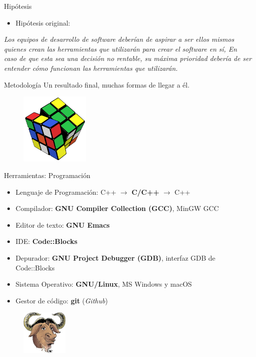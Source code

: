 \documentclass{beamer}
\begin{document}
\begin{frame}{Hipótesis}
  \begin{itemize}
    \item{Hipótesis original:}
  \end{itemize}
  \textit{Los equipos de desarrollo de software deberían de aspirar a ser ellos mismos quienes crean las herramientas que utilizarán para crear el software en sí, En caso de que esta sea una decisión no rentable, su máxima prioridad debería de ser entender cómo funcionan las herramientas que utilizarán.}
\end{frame}

\begin{frame}{Metodología}
  Un resultado final, muchas formas de llegar a él.
  \vfill
  \begin{figure} [h]
    \centering
    \includegraphics[width=0.3\textwidth]{img/rubik}
  \end{figure}
\end{frame}

\begin{frame}{Herramientas: Programación}
  \begin{itemize}
  \item{Lenguaje de Programación: C++ $\rightarrow$ \textbf{C/C++} $\rightarrow$ C++}
  \item{Compilador: \textbf{GNU Compiler Collection (GCC)}, MinGW GCC}
  \item{Editor de texto: \textbf{GNU Emacs}}
  \item{IDE: \textbf{Code::Blocks}}
  \item{Depurador: \textbf{GNU Project Debugger (GDB)}, interfaz GDB de Code::Blocks}
  \item{Sistema Operativo: \textbf{GNU/Linux}, MS Windows y macOS}
  \item{Gestor de código: \textbf{git} (\textit{Github})}
  \end{itemize}
  \begin{figure} [h]
    \centering
    \includegraphics[width=0.2\textwidth]{img/reiss-head}
  \end{figure}
\end{frame}
\end{document}
